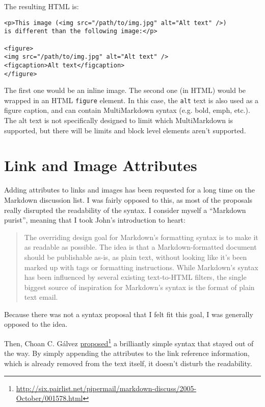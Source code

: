 The resulting HTML is:

\begin{verbatim}
<p>This image (<img src="/path/to/img.jpg" alt="Alt text" />)
is different than the following image:</p>

<figure>
<img src="/path/to/img.jpg" alt="Alt text" />
<figcaption>Alt text</figcaption>
</figure>
\end{verbatim}

The first one would be an inline image. The second one (in HTML) would be wrapped in an HTML \texttt{figure} element. In this case, the \texttt{alt} text is also used as a figure caption, and can contain MultiMarkdown syntax (e.g. bold, emph, etc.). The alt text is not specifically designed to limit which MultiMarkdown is supported, but there will be limits and block level elements aren't supported.

\section{Link and Image Attributes}
\label{linkandimageattributes}

Adding attributes to links and images has been requested for a long time on
the Markdown discussion list. I was fairly opposed to this, as most of the
proposals really disrupted the readability of the syntax. I consider myself a
``Markdown purist'', meaning that I took John's introduction to heart:

\begin{quote}
The overriding design goal for Markdown's formatting syntax is to make
it as readable as possible. The idea is that a Markdown-formatted
document should be publishable as-is, as plain text, without looking
like it's been marked up with tags or formatting instructions. While
Markdown's syntax has been influenced by several existing text-to-HTML
filters, the single biggest source of inspiration for Markdown's
syntax is the format of plain text email.
\end{quote}

Because there was not a syntax proposal that I felt fit this goal, I was generally opposed to the idea.

Then, Choan C. Gálvez \href{http://six.pairlist.net/pipermail/markdown-discuss/2005-October/001578.html}{proposed}\footnote{\href{http://six.pairlist.net/pipermail/markdown-discuss/2005-October/001578.html}{http:\slash{}\slash{}six.pairlist.net\slash{}pipermail\slash{}markdown-discuss\slash{}2005-October\slash{}001578.html}} a brilliantly simple syntax that
stayed out of the way. By simply appending the attributes to the link
reference information, which is already removed from the text itself, it
doesn't disturb the readability.

